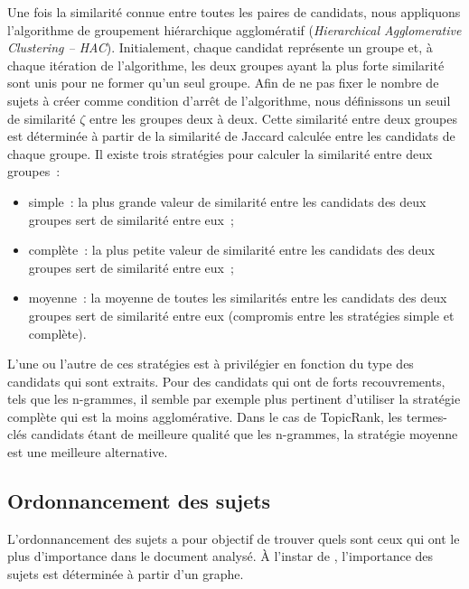     Une fois la similarité connue entre toutes les paires de candidats, nous
    appliquons l'algorithme de groupement hiérarchique agglomératif
    (\textit{Hierarchical Agglomerative Clustering -- HAC}). Initialement,
    chaque candidat représente un groupe et, à chaque itération de l'algorithme,
    les deux groupes ayant la plus forte similarité sont unis pour ne former
    qu'un seul groupe. Afin de ne pas fixer le nombre de sujets à créer comme
    condition d'arrêt de l'algorithme, nous définissons un seuil de similarité
    $\zeta$ entre les groupes deux à deux. Cette similarité entre deux groupes
    est déterminée à partir de la similarité de Jaccard calculée entre les
    candidats de chaque groupe. Il existe trois stratégies pour calculer la
    similarité entre deux groupes~:
    \begin{itemize}
      \item{simple~: la plus grande valeur de similarité entre les candidats
            des deux groupes sert de similarité entre eux~;}
      \item{complète~: la plus petite valeur de similarité entre les candidats
            des deux groupes sert de similarité entre eux~;}
      \item{moyenne~: la moyenne de toutes les similarités entre les
            candidats des deux groupes sert de similarité entre eux (compromis
            entre les stratégies simple et complète).}
    \end{itemize}
    L'une ou l'autre de ces stratégies est à privilégier en fonction du type des
    candidats qui sont extraits. Pour des candidats qui ont de forts
    recouvrements, tels que les n-grammes, il semble par exemple plus pertinent
    d'utiliser la stratégie complète qui est la moins agglomérative. Dans le cas
    de TopicRank, les termes-clés candidats étant de meilleure qualité que les
    n-grammes, la stratégie moyenne est une meilleure alternative.

  \subsection{Ordonnancement des sujets}
  \label{subsec:ordonnancement_des_sujets}
    L'ordonnancement des sujets a pour objectif de trouver quels sont ceux qui
    ont le plus d'importance dans le document analysé. À l'instar de
    , l'importance des sujets est déterminée à
    partir d'un graphe.

